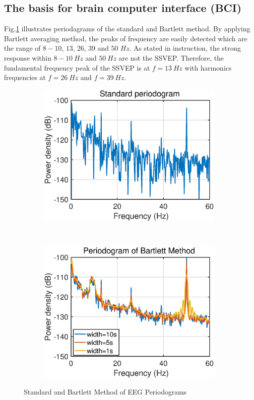 \subsection{The basis for brain computer interface (BCI)}
Fig.\ref{fig:1_2_b1} illustrates periodagrams of the standard and Bartlett method. By applying Bartlett averaging method, the peaks of frequency are easily detected which are the range of $8-10$, $13$, $26$, $39$ and $50$ $Hz$. As stated in instruction, the strong response within $8-10 \ Hz$ and $50 \ Hz$ are not the SSVEP\cite{mandic}. Therefore, the fundamental frequency peak of the SSVEP is at $f=13 \ Hz$ with harmonics frequencies at $f=26 \ Hz$ and $f=39 \ Hz$.
\begin{figure}[htp]
     \centering
     \begin{subfigure}{0.4\textwidth}
         \centering
         \includegraphics[width=\textwidth]{fig/12/12b1.eps}
     \end{subfigure}
     ~
     \begin{subfigure}{0.4\textwidth}
         \centering
         \includegraphics[width=\textwidth]{fig/12/12b2.eps}
     \end{subfigure}
        \caption{Standard and Bartlett Method of EEG Periodograms}
        \label{fig:1_2_b1}
\end{figure}\\
